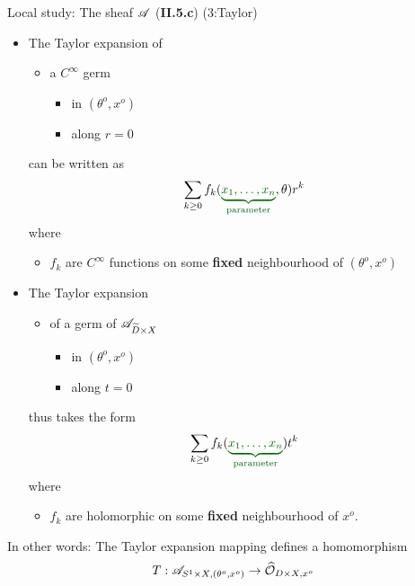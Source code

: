 \begin{frame}[t]{Local study: The sheaf $\mathscr{A}$ (\textbf{II.5.c}) (3:Taylor)}
  \begin{itemize}
    \item The Taylor expansion of
      \begin{itemize}
        \item a $C^\infty$ germ
          \begin{itemize}
            \item in $(\theta^o,x^o)$
            \item along $r=0$
          \end{itemize}
      \end{itemize}
      can be written as
      \[
        \sum_{k\geq0}f_k(\textcolor{green!40!black}{\underset{\text{parameter}}
          {\underbrace{x_1,\ldots,x_n}}},\theta)r^k
      \]
      where
      \begin{itemize}
        \item $f_k$ are $C^\infty$ functions on some \textbf{fixed}
          neighbourhood of $(\theta^o,x^o)$
      \end{itemize}
    \item The Taylor expansion
      \begin{itemize}
        \item of a germ of $\mathscr{A}_{\widetilde D\times X}$
          \begin{itemize}
            \item in $(\theta^o,x^o)$
            \item along $t=0$
          \end{itemize}
      \end{itemize}
      thus takes the form
      \[
        \sum_{k\geq0}f_k(\textcolor{green!40!black}{\underset{\text{parameter}}
          {\underbrace{x_1,\ldots,x_n}}})t^k
      \]
      where
      \begin{itemize}
        \item $f_k$ are holomorphic on some \textbf{fixed} neighbourhood of
          $x^o$.
      \end{itemize}
  \end{itemize}
  In other words: The Taylor expansion mapping defines a homomorphism
  \[
    T:\mathscr{A}_{S^1\times X,(\theta^o,x^o)}\to\widehat{\mathcal{O}}_{D\times X,x^o}
  \]
\end{frame}

